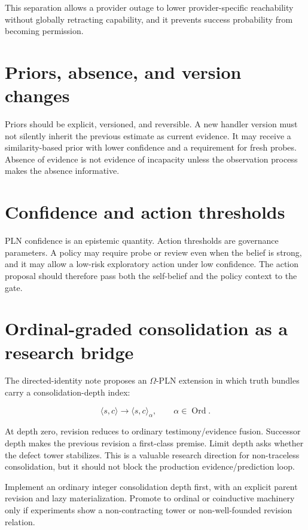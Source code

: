 \documentclass[11pt,oneside]{report}
\begin{document}
This separation allows a provider outage to lower provider-specific reachability without globally retracting capability, and it prevents success probability from becoming permission.

\section{Priors, absence, and version changes}

Priors should be explicit, versioned, and reversible. A new handler version must not silently inherit the previous estimate as current evidence. It may receive a similarity-based prior with lower confidence and a requirement for fresh probes. Absence of evidence is not evidence of incapacity unless the observation process makes the absence informative.

\section{Confidence and action thresholds}

PLN confidence is an epistemic quantity. Action thresholds are governance parameters. A policy may require probe or review even when the belief is strong, and it may allow a low-risk exploratory action under low confidence. The action proposal should therefore pass both the self-belief and the policy context to the gate.

\section{Ordinal-graded consolidation as a research bridge}

The directed-identity note proposes an $\Omega$-PLN extension in which truth bundles carry a consolidation-depth index:

\[
\langle s,c\rangle\longrightarrow\langle s,c\rangle_{\alpha},
\qquad \alpha\in\operatorname{Ord}.
\]

At depth zero, revision reduces to ordinary testimony/evidence fusion. Successor depth makes the previous revision a first-class premise. Limit depth asks whether the defect tower stabilizes. This is a valuable research direction for non-traceless consolidation, but it should not block the production evidence/prediction loop.

\begin{researchbox}
Implement an ordinary integer consolidation depth first, with an explicit parent revision and lazy materialization. Promote to ordinal or coinductive machinery only if experiments show a non-contracting tower or non-well-founded revision relation.
\end{researchbox}
\end{document}
